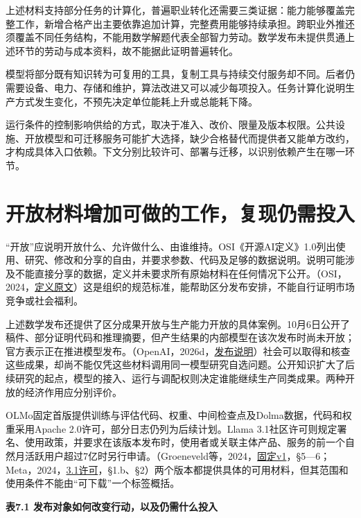 \documentclass[UTF8,fontset=windows,12pt,a4paper,oneside,openany]{ctexbook}
\begin{document}
上述材料支持部分任务的计算化，普遍职业转化还需要三类证据：能力能够覆盖完整工作，新增合格产出主要依靠追加计算，完整费用能够持续承担。跨职业外推还须覆盖不同任务结构，不能用数学解题代表全部智力劳动。数学发布未提供贯通上述环节的劳动与成本资料，故不能据此证明普遍转化。

模型将部分既有知识转为可复用的工具，复制工具与持续交付服务却不同。后者仍需要设备、电力、存储和维护，算法改进又可以减少每项投入。任务计算化说明生产方式发生变化，不预先决定单位能耗上升或总能耗下降。

运行条件的控制影响供给的方式，取决于准入、改价、限量及版本权限。公共设施、开放模型和可迁移服务可能扩大选择，缺少合格替代而提供者又能单方改约，才构成具体入口依赖。下文分别比较许可、部署与迁移，以识别依赖产生在哪一环节。



\section{开放材料增加可做的工作，复现仍需投入}

“开放”应说明开放什么、允许做什么、由谁维持。OSI《开源AI定义》1.0列出使用、研究、修改和分享的自由，并要求参数、代码及足够的数据说明。说明可能涉及不能直接分享的数据，定义并未要求所有原始材料在任何情况下公开。（OSI，2024，\href{https://opensource.org/ai/open-source-ai-definition}{定义原文}）这是组织的规范标准，能帮助区分发布安排，不能自行证明市场竞争或社会福利。

上述数学发布还提供了区分成果开放与生产能力开放的具体案例。10月6日公开了稿件、部分证明代码和推理摘要，但产生结果的内部模型在该次发布时尚未开放；官方表示正在推进模型发布。（OpenAI，2026d，\href{https://openai.com/index/sharing-ai-progress-in-mathematics/}{发布说明}）社会可以取得和核查这些成果，却尚不能仅凭这些材料调用同一模型研究自选问题。公开知识扩大了后续研究的起点，模型的接入、运行与调配权则决定谁能继续生产同类成果。两种开放的经济作用应分别评价。

OLMo固定首版提供训练与评估代码、权重、中间检查点及Dolma数据，代码和权重采用Apache 2.0许可，部分日志仍列为后续计划。Llama 3.1社区许可则规定署名、使用政策，并要求在该版本发布时，使用者或关联主体产品、服务的前一个自然月活跃用户超过7亿时另行申请。（Groeneveld等，2024，\href{https://arxiv.org/html/2402.00838v1}{固定v1}，§5—6；Meta，2024，\href{https://raw.githubusercontent.com/meta-llama/llama-models/main/models/llama3_1/LICENSE}{3.1许可}，§1.b、§2）两个版本都提供具体的可用材料，但其范围和使用条件不能由“可下载”一个标签概括。

\textbf{表7.1 发布对象如何改变行动，以及仍需什么投入}
\end{document}

